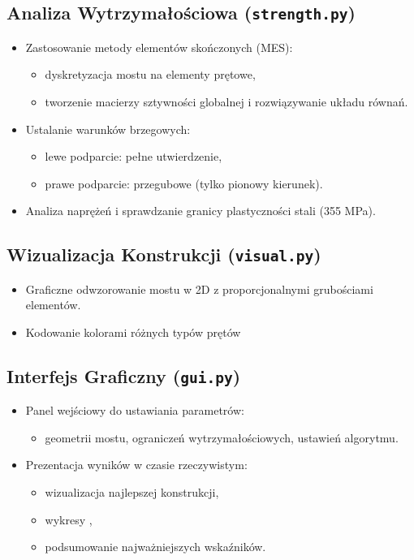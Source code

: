 \documentclass[12pt,a4paper]{article}
\begin{document}
\subsection{Analiza Wytrzymałościowa (\texttt{strength.py})}
\begin{itemize}
    \item Zastosowanie metody elementów skończonych (MES):
    \begin{itemize}
        \item dyskretyzacja mostu na elementy prętowe,
        \item tworzenie macierzy sztywności globalnej i rozwiązywanie układu równań.
    \end{itemize}
    \item Ustalanie warunków brzegowych:
    \begin{itemize}
        \item lewe podparcie: pełne utwierdzenie,
        \item prawe podparcie: przegubowe (tylko pionowy kierunek).
    \end{itemize}
    \item Analiza naprężeń i sprawdzanie granicy plastyczności stali (355 MPa).
\end{itemize}

\subsection{Wizualizacja Konstrukcji (\texttt{visual.py})}
\begin{itemize}
    \item Graficzne odwzorowanie mostu w 2D z proporcjonalnymi grubościami elementów.
    \item Kodowanie kolorami różnych typów prętów  
\end{itemize}

\subsection{Interfejs Graficzny (\texttt{gui.py})}
\begin{itemize}
    \item Panel wejściowy do ustawiania parametrów:
    \begin{itemize}
        \item geometrii mostu, ograniczeń wytrzymałościowych, ustawień algorytmu.
    \end{itemize}
    \item Prezentacja wyników w czasie rzeczywistym:
    \begin{itemize}
        \item wizualizacja najlepszej konstrukcji,
        \item wykresy  ,
        \item podsumowanie najważniejszych wskaźników.
    \end{itemize}
\end{itemize}
\end{document}
